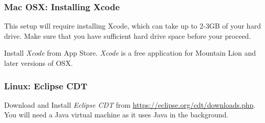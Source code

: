 \subsubsection{Mac OSX: Installing Xcode}
\label{sec:install-from-package}

This setup will require installing Xcode, which can
take up to 2-3GB of your hard drive. Make sure that you have
sufficient hard drive space before your proceed.

 Install \emph{Xcode} from App Store. \emph{Xcode} is a free
  application for Mountain Lion and later versions of OSX.
      


\subsubsection{Linux: Eclipse CDT}

 Download and Install \emph{Eclipse CDT} from \url{https://eclipse.org/cdt/downloads.php}. You will need a Java virtual machine as it uses Java in the background.
